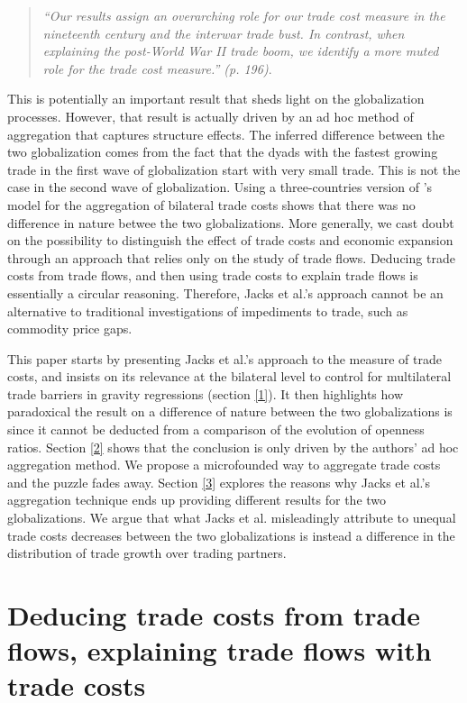 \documentclass{article}
\begin{document}
\begin{quote}
\emph{``Our results assign an overarching role for our trade
cost measure in the nineteenth century and the interwar trade
bust. In contrast, when explaining the post-World War II trade
boom, we identify a more muted role for the trade cost
measure.'' (p. 196)}.
\end{quote}

This is potentially an important result that sheds light on the globalization processes. However, that result is actually driven by an ad hoc
method of aggregation that captures structure effects. The inferred difference between the two globalization comes from the fact that the dyads with the 
fastest growing trade in the first wave of globalization start with very small 
trade. This is not the case in the second wave of globalization.
Using a three-countries version of \cite{AW2003}'s model for
the aggregation of bilateral trade costs shows that there was no 
difference in nature betwee the two globalizations. More generally, we
cast doubt on the possibility to distinguish the effect of trade costs and economic expansion through an approach that relies only on the study of trade
flows. Deducing trade costs from trade flows, and then using
trade costs to explain trade flows is essentially a circular
reasoning. Therefore, Jacks et al.'s approach cannot be an
alternative to traditional investigations of impediments to
trade, such as commodity price gaps.

This paper starts by presenting Jacks et al.'s approach to the
measure of trade costs, and insists on its relevance at the
bilateral level to control for multilateral trade barriers in
gravity regressions (section \ref{1}). It then highlights how paradoxical the
result on a difference of nature between the two globalizations
is since it cannot be deducted from a comparison of the
evolution of openness ratios. Section \ref{2} shows that the
conclusion is only driven by the authors' ad hoc aggregation
method. We propose a microfounded way to aggregate trade costs
and the puzzle fades away. Section \ref{3} explores the reasons
why Jacks et al.'s aggregation technique ends up providing
different results for the two globalizations. We argue that
what Jacks et al. misleadingly attribute to unequal trade costs
decreases between the two globalizations is instead a
difference in the distribution of trade growth over trading
partners.

\section{\label{1} Deducing trade costs from trade flows, explaining trade flows with trade costs}
\end{document}
